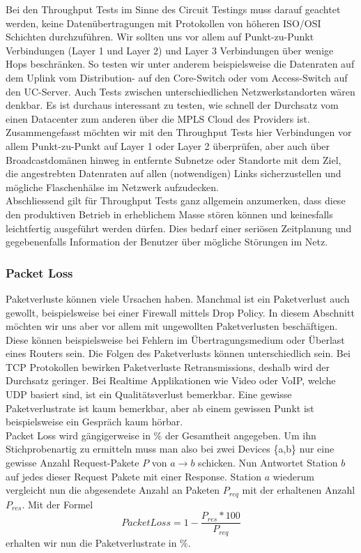\documentclass[a4,12pt]{scrartcl}
\begin{document}
\noindent
Bei den Throughput Tests im Sinne des Circuit Testings muss darauf geachtet werden, keine Datenübertragungen mit Protokollen von höheren ISO/OSI Schichten durchzuführen. Wir sollten uns vor allem auf Punkt-zu-Punkt Verbindungen (Layer 1 und Layer 2) und Layer 3 Verbindungen über wenige Hops beschränken. So testen wir unter anderem beispielsweise die Datenraten auf dem Uplink vom Distribution- auf den Core-Switch oder vom Access-Switch auf den UC-Server. Auch Tests zwischen unterschiedlichen Netzwerkstandorten wären denkbar. Es ist durchaus interessant zu testen, wie schnell der Durchsatz vom einen Datacenter zum anderen über die MPLS Cloud des Providers ist. Zusammengefasst möchten wir mit den Throughput Tests hier Verbindungen vor allem Punkt-zu-Punkt auf Layer 1 oder Layer 2 überprüfen, aber auch über Broadcastdomänen hinweg in entfernte Subnetze oder Standorte mit dem Ziel, die angestrebten Datenraten auf allen (notwendigen) Links sicherzustellen und mögliche Flaschenhälse im Netzwerk aufzudecken.\\

\noindent Abschliessend gilt für Throughput Tests ganz allgemein anzumerken, dass diese den produktiven Betrieb in erheblichem Masse stören können und keinesfalls leichtfertig ausgeführt werden dürfen. Dies bedarf einer seriösen Zeitplanung und gegebenenfalls Information der Benutzer über mögliche Störungen im Netz.

\subsubsection{Packet Loss} 
Paketverluste können viele Ursachen haben. Manchmal ist ein Paketverlust auch gewollt, beispielsweise bei einer Firewall mittels Drop Policy. In diesem Abschnitt möchten wir uns aber vor allem mit ungewollten Paketverlusten beschäftigen. Diese können beispielsweise bei Fehlern im Übertragungsmedium oder Überlast eines Routers sein. Die Folgen des Paketverlusts können unterschiedlich sein. Bei TCP Protokollen bewirken Paketverluste Retransmissions, deshalb wird der Durchsatz geringer. Bei Realtime Applikationen wie Video oder VoIP, welche UDP basiert sind, ist ein Qualitätsverlust bemerkbar. Eine gewisse Paketverlustrate ist kaum bemerkbar, aber ab einem gewissen Punkt ist beispielsweise ein Gespräch kaum hörbar.\\

\noindent Packet Loss wird gängigerweise in \% der Gesamtheit angegeben. Um ihn Stichprobenartig zu ermitteln muss man also bei zwei Devices \{a,b\} nur eine gewisse Anzahl Request-Pakete $P$ von $a \rightarrow b$ schicken. Nun Antwortet Station $b$ auf jedes dieser Request Pakete mit einer Response. Station $a$ wiederum vergleicht nun die abgesendete Anzahl an Paketen $P_{req}$ mit der erhaltenen Anzahl $P_{res}$. 
Mit der Formel
\begin{equation}
Packet Loss = 1-\frac{P_{res} * 100}{P_{req}}
\end{equation}
erhalten wir nun die Paketverlustrate in \%.\\
\end{document}
